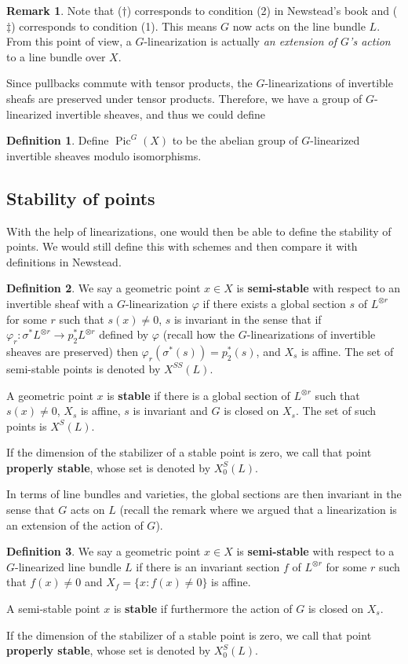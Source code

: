 \documentclass[12pt]{report}
\theoremstyle{remark}
\theoremstyle{definition}
\newtheorem{remark}{Remark}[section]
\newtheorem{definition}{Definition}[section]
\newcommand{\s}[0]{\sigma}
\newcommand{\Pic}[0]{\operatorname{Pic}}
\begin{document}
    \begin{remark}
    Note that ($\dagger$) corresponds to condition (2) in Newstead's book and ($\ddagger$) corresponds to condition (1). This means $G$ now acts on the line bundle $L$. From this point of view, a $G$-linearization is actually \textit{an extension of $G$'s action} to a line bundle over $X$.
    \end{remark}
    Since pullbacks commute with tensor products, the $G$-linearizations of invertible sheafs are preserved under tensor products. Therefore, we have a group of $G$-linearized invertible sheaves, and thus we could define
    \begin{definition}
        Define $\Pic^G(X)$ to be the abelian group of $G$-linearized invertible sheaves modulo isomorphisms.
    \end{definition}
    \subsection{Stability of points}
    With the help of linearizations, one would then be able to define the stability of points. We would still define this with schemes and then compare it with definitions in Newstead.
    \begin{definition}
        We say a geometric point $x\in X$ is \textbf{semi-stable} with respect to an invertible sheaf with a $G$-linearization $\varphi$ if there exists a global section $s$ of $L^{\otimes r}$ for some $r$ such that $s(x)\neq 0$, $s$ is invariant in the sense that if $\varphi_r:\s^*L^{\otimes r}\to p_2^*L^{\otimes r}$ defined by $\varphi$ (recall how the $G$-linearizations of invertible sheaves are preserved) then $\varphi_r(\s^*(s))=p_2^*(s)$, and $X_s$ is affine. The set of semi-stable points is denoted by $X^{SS}(L)$.

        A geometric point $x$ is \textbf{stable} if there is a global section of $L^{\otimes r}$ such that $s(x)\neq 0$, $X_s$ is affine, $s$ is invariant and $G$ is closed on $X_s$. The set of such points is $X^S(L)$.

        If the dimension of the stabilizer of a stable point is zero, we call that point \textbf{properly stable}, whose set is denoted by $X^S_0(L)$.
    \end{definition}
    In terms of line bundles and varieties, the global sections are then invariant in the sense that $G$ acts on $L$ (recall the remark where we argued that a linearization is an extension of the action of $G$).
    \begin{definition}
        We say a geometric point $x\in X$ is \textbf{semi-stable} with respect to a $G$-linearized line bundle $L$ if there is an invariant section $f$ of $L^{\otimes r}$ for some $r$ such that $f(x)\neq 0$ and $X_f=\{x:f(x)\neq 0\}$ is affine.

        A semi-stable point $x$ is \textbf{stable} if furthermore the action of $G$ is closed on $X_s$.

        If the dimension of the stabilizer of a stable point is zero, we call that point \textbf{properly stable}, whose set is denoted by $X^S_0(L)$.
    \end{definition}
\end{document}
